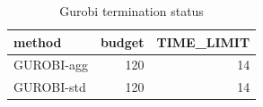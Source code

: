 \begin{table}[htbp]
\centering
\small
\caption{Gurobi termination status}
\label{tab:E6_scalability_gurobi_status}
\begin{tabular}{lrr}
\toprule
method & budget & TIME\_LIMIT \\
\midrule
GUROBI-agg & 120 & 14 \\
GUROBI-std & 120 & 14 \\
\bottomrule
\end{tabular}
\end{table}

